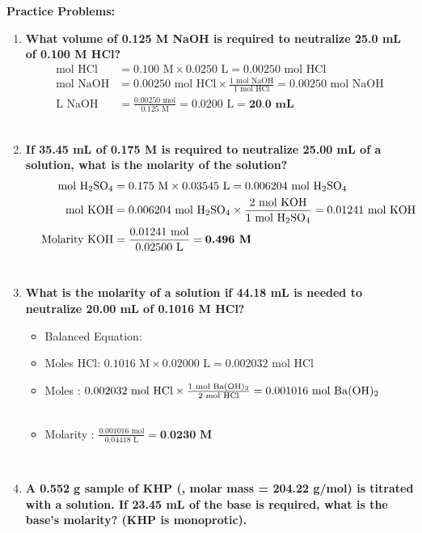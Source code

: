 \documentclass{article}
\begin{document}
\textbf{Practice Problems:}
\begin{enumerate}[itemsep=5pt]
    \item \textbf{What volume of 0.125 M NaOH is required to neutralize 25.0 mL of 0.100 M HCl? }
    \begin{align*}
        \text{mol HCl} &= 0.100 \text{ M} \times 0.0250 \text{ L} = 0.00250 \text{ mol HCl} \\
        \text{mol NaOH} &= 0.00250 \text{ mol HCl} \times \frac{1 \text{ mol NaOH}}{1 \text{ mol HCl}} = 0.00250 \text{ mol NaOH} \\
        \text{L NaOH} &= \frac{0.00250 \text{ mol}}{0.125 \text{ M}} = 0.0200 \text{ L} = \textbf{20.0 mL}
    \end{align*}
    \item \textbf{If 35.45 mL of 0.175 M  is required to neutralize 25.00 mL of a  solution, what is the molarity of the  solution? }
    \begin{align*}
        \text{mol } \ce{H2SO4} &= 0.175 \text{ M} \times 0.03545 \text{ L} = 0.006204 \text{ mol } \ce{H2SO4} \\
        \text{mol KOH} &= 0.006204 \text{ mol } \ce{H2SO4} \times \frac{2 \text{ mol KOH}}{1 \text{ mol } \ce{H2SO4}} = 0.01241 \text{ mol KOH} \\
        \text{Molarity KOH} &= \frac{0.01241 \text{ mol}}{0.02500 \text{ L}} = \textbf{0.496 M}
    \end{align*}
    \item \textbf{What is the molarity of a  solution if 44.18 mL is needed to neutralize 20.00 mL of 0.1016 M HCl?}
    \begin{itemize}
        \item Balanced Equation: 
        \item Moles HCl: $0.1016 \text{ M} \times 0.02000 \text{ L} = 0.002032 \text{ mol HCl}$
        \item Moles : $0.002032 \text{ mol HCl} \times \frac{1 \text{ mol } \ce{Ba(OH)2}}{2 \text{ mol HCl}} = 0.001016 \text{ mol } \ce{Ba(OH)2}$
        \item Molarity : $\frac{0.001016 \text{ mol}}{0.04418 \text{ L}} = \textbf{0.0230 M}$
    \end{itemize}
    \item \textbf{A 0.552 g sample of KHP (, molar mass = 204.22 g/mol) is titrated with a  solution. If 23.45 mL of the base is required, what is the base's molarity? (KHP is monoprotic).}

\end{enumerate}
\end{document}
